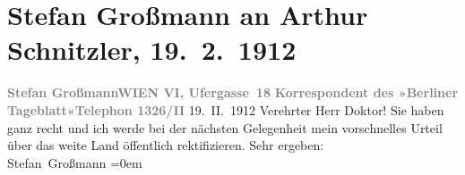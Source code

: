 

         \newcommand{\erwaehnteInstitutionen}{Institutionen: Berliner Tageblatt}
         \newcommand{\erwaehnteOrte}{Orte: Linke Wienzeile, Wien}
         \newcommand{\erwaehnteWerke}{Werke: Das weite Land. Tragikomödie in fünf Akten, Schnitzlers »Weites Land«. Erste Aufführung im Burgtheater}
               \section[Stefan Großmann an Arthur Schnitzler, 19. 2. 1912]{ Stefan Großmann an Arthur Schnitzler, 19. 2. 1912}\nopagebreak{}\rehead{ }\begin{ledgroupsized}[t]{13cm}\normalsize\beginnumbering \toendnotes[C]{\smallbreak\pagebreak[2]} 
\toendnotes[C]{\smallbreak}\pstart
           \noindent{}{\pb}\textcolor{gray}{\textbf{Stefan Großmann}}\hfill \textcolor{gray}{\textbf{WIEN VI, Ufergasse 18}}\pend
           \pstart
           \textcolor{gray}{\textbf{Korrespondent des »Berliner Tageblatt«}}\hfill \textcolor{gray}{\textbf{Telephon 1326/II}}\pend
           \pstart
           \centering{}19. II. 1912\pend
           \pstart\center{}Verehrter Herr Doktor!\pend\pstart
           Sie haben ganz recht und ich werde bei der nächsten Gelegenheit mein vorschnelles
                    Urteil
                     über das weite
                        Land öffentlich rektifizieren.\pend
           \pstart
           Sehr ergeben:{\\[\baselineskip]}\spacefill\mbox{Stefan Großmann}\pend
           \leftskip=0em{}
         
         \endnumbering{}\end{ledgroupsized}  \newcommand{\dateiname}{L02057}\newcommand{\titel}{Stefan Großmann an Arthur Schnitzler, 19. 2. 1912}\newcommand{\editorInnen}{Martin Anton Müller und Gerd-Hermann Susen}
      